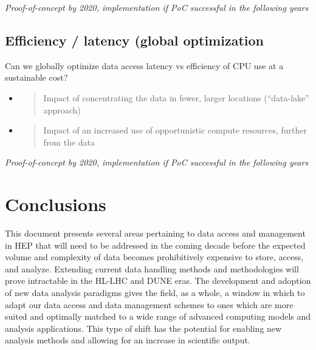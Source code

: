\documentclass[12pt,a4paper]{article}
\begin{document}
\emph{Proof-of-concept by 2020, implementation if PoC successful in the following years}

\subsection{Efficiency / latency (global
optimization}\label{efficiency-latency}
Can we globally optimize data access latency vs
efficiency of CPU use at a sustainable cost?

\begin{itemize}
\item
  \begin{quote}
  \protect\hypertarget{_ykqlttltg8mz}{}{}Impact of concentrating the
  data in fewer, larger locations (``data-lake'' approach)
  \end{quote}
\item
  \begin{quote}
  \protect\hypertarget{_ym4ou9y4kpdu}{}{}Impact of an increased use of
  opportunistic compute resources, further from the data
  \end{quote}
\end{itemize}

\emph{Proof-of-concept by 2020, implementation if PoC successful in the following years}

\section{Conclusions}\label{conclusions}

This document presents several
areas pertaining to data access and management in HEP that will need to
be addressed in the coming decade before the expected volume and
complexity of data becomes prohibitively expensive to store, access, and
analyze. Extending current data handling methods and methodologies will
prove intractable in the HL-LHC and DUNE eras. The development and
adoption of new data analysis paradigms gives the field, as a whole, a
window in which to adapt our data access and data management schemes to
ones which are more suited and optimally matched to a wide range of
advanced computing models and analysis applications. This type of shift
has the potential for enabling new analysis methods and allowing for an
increase in scientific output.


\sloppy
\raggedright
\clearpage
\printbibliography[title={References},heading=bibintoc]
\end{document}
